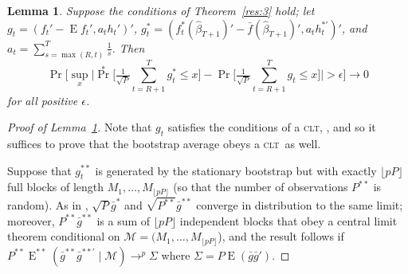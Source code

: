 \documentclass[12pt,fleqn]{article}
\newtheorem{lema}{Lemma}[section]
\theoremstyle{definition}
\DeclareMathOperator{\E}{E}
\DeclareMathOperator{\pr}{Pr}
\newcommand{\clt}{\textsc{clt}}
\begin{document}
\begin{lema}\label{res:a3}
  Suppose the conditions of Theorem~\ref{res:3} hold; let $g_{t} =
  (f_{t}' - \E f_{t}', a_t h_{t}')'$, $g_t^{*} =
  (f_t^{*}(\hat{\beta}_{T+1})' - \bar{f}(\hat{\beta}_{T+1})', a_t
  h_t^{*\prime})'$, and $a_t = \sum_{s=\max(R,t)}^T \tfrac{1}{s}$.  Then
  \begin{equation}\label{eq:1}
    \pr\Big[\sup_x \Big| \pr^{*}\Big[ \tfrac{1}{\sqrt{P}} \sum_{t=R+1}^T g_{t}^{*}
    \leq x \Big] - \pr\Big[ \tfrac{1}{\sqrt{P}} \sum_{t=R+1}^T g_{t}
    \leq x \Big] \Big| > \epsilon \Big] \to 0
  \end{equation}
  for all positive $\epsilon$.
\end{lema}

\begin{proof}[Proof of Lemma~\ref{res:a3}]
  Note that $g_t$ satisfies the conditions of a \clt,
  \citep[Theorem~2]{Jon:97}, and so it suffices to prove that the
  bootstrap average obeys a \clt\ as well.

  Suppose that $g_t^{**}$ is generated by the stationary bootstrap but
  with exactly $\lfloor p P \rfloor$ full blocks of length
  $M_1,\dots,M_{\lfloor p P \rfloor}$ (so that the number of
  observations $P^{**}$ is random).  As in \citet{Cal:11d}, $\sqrt{P}
  \bar{g}^{*}$ and $\sqrt{P^{**}} \bar{g}^{**}$ converge in
  distribution to the same limit; moreover, $P^{**} \bar{g}^{**}$ is a
  sum of $\lfloor p P \rfloor$ independent blocks that obey a central
  limit theorem conditional on $\mathcal{M} = (M_1,\dots,M_{\lfloor p
    P \rfloor}$), and the result follows if $P^{**}
  \E^{**}(\bar{g}^{**} \bar{g}^{**\prime} \mid \mathcal{M}) \to^p
  \Sigma$ where $\Sigma = P \E(\bar{g} \bar{g}')$.


\end{proof}
\end{document}
